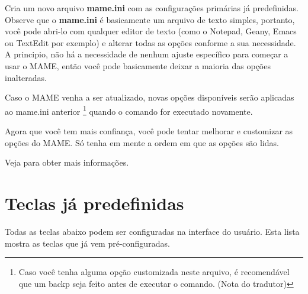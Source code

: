 \documentclass[letterpaper,10pt,brazil]{sphinxmanual}
\begin{document}
Cria um novo arquivo \textbf{mame.ini} com as configurações primárias já
predefinidas.
Observe que o \textbf{mame.ini} é basicamente um arquivo de texto simples,
portanto, você pode abri-lo com qualquer editor de texto (como o
Notepad, Geany, Emacs ou TextEdit por exemplo) e alterar todas as opções
conforme a sua necessidade. A principio, não há a necessidade de nenhum
ajuste específico para começar a usar o MAME, então você pode
basicamente deixar a maioria das opções inalteradas.

Caso o MAME venha a ser atualizado, novas opções disponíveis serão
aplicadas ao mame.ini anterior \footnote[2]{\sphinxAtStartFootnote%
Caso você tenha alguma opção customizada neste arquivo, é
recomendável que um backp seja feito antes de executar o
comando. (Nota do tradutor)
} quando o comando for executado
novamente.

Agora que você tem mais confiança, você pode tentar melhorar e
customizar as opções do MAME. Só tenha em mente a ordem em que as opções
são lidas.

Veja {\hyperref[advanced/multiconfig:advanced\string-multi\string-cfg]{}} para obter mais informações.


\section{Teclas já predefinidas}
\label{usingmame/defaultkeys:default-keys}\label{usingmame/defaultkeys::doc}\label{usingmame/defaultkeys:teclas-ja-predefinidas}
Todas as teclas abaixo podem ser configuradas na interface do usuário.
Esta lista mostra as teclas que já vem pré-configuradas.
\end{document}
